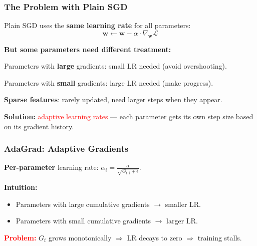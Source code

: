\documentclass[notes,11pt, aspectratio=169]{beamer}
\newenvironment{wideitemize}{\itemize\addtolength{\itemsep}{10pt}}{\enditemize}
\newcommand{\vw}{\mathbf{w}}
\newcommand{\vg}{\mathbf{g}}
\begin{document}
\begin{frame}
\frametitle{The Problem with Plain SGD}

Plain SGD uses the \textbf{same learning rate} for all parameters:
\[
    \vw \leftarrow \vw - \alpha \cdot \nabla_{\vw}\mathcal{L}
\]

\vspace{4pt}
\textbf{But some parameters need different treatment:}
\begin{wideitemize}
    \item Parameters with \textbf{large} gradients: small LR needed (avoid overshooting).
    \item Parameters with \textbf{small} gradients: large LR needed (make progress).
    \item \textbf{Sparse features}: rarely updated, need larger steps when they appear.
\end{wideitemize}

\vspace{6pt}
\textbf{Solution:} \textcolor{red}{adaptive learning rates} --- each parameter gets its own step size based on its gradient history.
\end{frame}

\begin{frame}
\frametitle{AdaGrad: Adaptive Gradients}


\vspace{6pt}
\textbf{Per-parameter} learning rate: $\alpha_i = \frac{\alpha}{\sqrt{G_{t,i} + \epsilon}}$.

\vspace{4pt}
\textbf{Intuition:}
\begin{itemize}
    \item Parameters with large cumulative gradients $\to$ smaller LR.
    \item Parameters with small cumulative gradients $\to$ larger LR.
\end{itemize}

\vspace{6pt}
\textcolor{red}{\textbf{Problem:}} $G_t$ grows monotonically $\Rightarrow$ LR decays to zero $\Rightarrow$ training stalls.
\end{frame}
\end{document}
